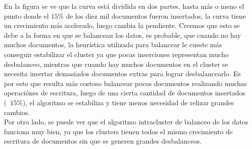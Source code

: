 En la figura se ve que la curva está dividida en dos partes, hasta más o meno el punto donde el $15\%$ de los diez mil documentos fueron insertados, la curva tiene un crecimiento más acelerado, luego cambia la pendiente. Creemos que esto se debe a la forma en que se balancean los datos, es probable, que cuando no hay muchos documentos, la heurística utilizada para balancear le cueste más conseguir estabilizar el cluster ya que pocas inserciones representan mucho desbalanceo, mientras que cuando hay muchos documentos en el cluster se necesita insertar demasiados documentos extras para lograr desbalancearlo. Es por esto que resulta más costoso balancear pocos documentos realizando muchas operaciónes de escritura, luego de una cierta cantidad de documentos insertados (~$15\%$), el algoritmo se estabiliza y tiene menos necesidad de relizar grandes cambios. \\

Por otro lado, se puede ver que el algoritmo intracluster de balanceo de los datos funciona muy bien, ya que los clusters tienen todos el mismo crecimiento de escritura de documentos sin que se generen grandes desbalanceos. \\